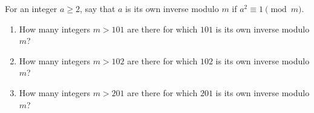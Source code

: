 For an integer $a\ge2$, say that $a$ is its own inverse modulo $m$ if $a^2\equiv1\pmod m$.
\begin{enumerate}
\item[(a)] How many integers $m>101$ are there for which $101$ is its own inverse modulo $m$?
\item[(b)] How many integers $m>102$ are there for which $102$ is its own inverse modulo $m$?
\item[(c)] How many integers $m>201$ are there for which $201$ is its own inverse modulo $m$?
\end{enumerate}
